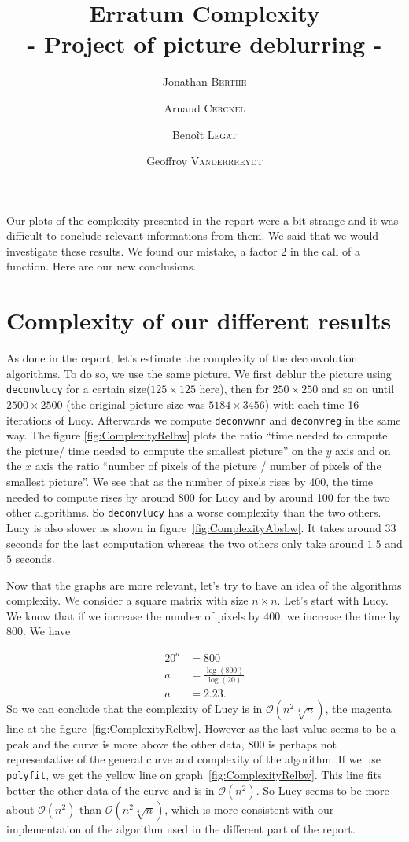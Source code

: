 \documentclass{article}
\title{ \textbf{Erratum Complexity} \\ - Project of picture deblurring - }
\author{Jonathan \textsc{Berthe} \and Arnaud \textsc{Cerckel} \and Benoît \textsc{Legat} \and Geoffroy \textsc{Vanderrreydt}}
\begin{document}
\maketitle

Our plots of the complexity presented in the report were a bit strange and it was difficult to conclude relevant informations from them. We said that we would investigate these results.  We found our mistake, a factor 2 in the call of a function. Here are our new conclusions.  

\section{Complexity of our different results}


As done in the report, let's estimate the complexity of the deconvolution algorithms. To do so, we use the same picture. We first deblur the picture using \texttt{deconvlucy} for a certain size($125 \times 125$ here), then for $250 \times 250$ and so on until $2500 \times 2500$ (the original picture  size was $5184 \times 3456$) with each time 16 iterations of Lucy. Afterwards we compute  \texttt{deconvwnr} and \texttt{deconvreg} in the same way. The figure \ref{fig:ComplexityRelbw} plots the ratio ``time needed to compute the picture/ time needed to compute the smallest picture'' on the $y$ axis and on the $x$ axis the ratio ``number of pixels of the picture / number of pixels of the smallest picture''. We see that as the number of pixels rises by 400, the time needed to compute rises by around 800 for Lucy and by around 100 for the two other algorithms. So \texttt{deconvlucy} has a worse complexity than the two others. Lucy is also slower as shown in figure~\ref{fig:ComplexityAbsbw}. It takes around $33$ seconds for the last computation whereas the two others only take around $1.5$ and $5$ seconds.

Now that the graphs are more relevant, let's try to have an idea of the algorithms complexity. We consider a square matrix with size $n \times n$. Let's start with Lucy. We know that if we increase the number of pixels by $400$, we increase the time by $800$. We have 

\begin{align*}
20^a &= 800\\
a &= \frac{\log(800)}{\log(20)}\\
a &= 2.23.
\end{align*} 
So we can conclude that the complexity of Lucy is in $\mathcal{O}(n^2\sqrt[4]{n})$, the magenta line at the figure~\ref{fig:ComplexityRelbw}. However as the last value seems to be a peak and the curve is more above the other data, $800$ is perhaps not representative of the general curve and complexity of the algorithm. If we use \texttt{polyfit}, we get the yellow line on graph~\ref{fig:ComplexityRelbw}. This line fits better the other data of the curve and is in $\mathcal{O}(n^2)$. So Lucy seems to be more about $\mathcal{O}(n^2)$ than $\mathcal{O}(n^2\sqrt[4]{n})$, which is more consistent with our implementation of the algorithm used in the different part of the report.  
\end{document}
